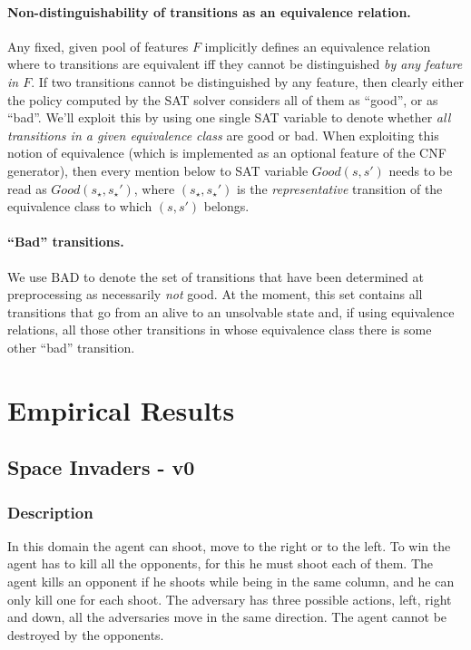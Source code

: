 \documentclass[a4paper]{article}
\newcommand{\badtx}{\ensuremath{\mathrm{BAD}}}
\begin{document}
\paragraph{Non-distinguishability of transitions as an equivalence relation.}
Any fixed, given pool of features $F$ implicitly defines an equivalence relation where to transitions are
equivalent iff they cannot be distinguished \emph{by any feature in $F$}.
If two transitions cannot be distinguished by any feature, then clearly either the policy computed by the SAT solver
considers all of them as ``good'', or as ``bad''.
We'll exploit this by using one single SAT variable to denote whether \emph{all transitions in a given equivalence
class} are good or bad. When exploiting this notion of equivalence (which is implemented as an optional feature of
the CNF generator), then every mention below to SAT variable $Good(s, s')$ needs to be read as $Good(s_{\star}, s_{\star}')$,
where $(s_{\star}, s_{\star}')$ is the \emph{representative} transition of the equivalence class to which $(s, s')$ belongs.

\paragraph{``Bad'' transitions.}
We use \badtx{} to denote the set of transitions that have been determined at preprocessing as necessarily
\emph{not} good.
At the moment, this set contains all transitions that go from an alive to an unsolvable state and, if using
equivalence relations, all those other transitions in whose equivalence class there is some other ``bad'' transition.


\newpage

\section{Empirical Results}


\subsection{Space Invaders - v0}
\subsubsection{Description}
In this domain the agent can shoot, move to the right or to the left. To win the agent has to kill all the opponents, for this he must shoot each of them. The agent kills an opponent if he shoots while being in the same column, and he can only kill one for each shoot. The adversary has three possible actions, left, right and down, all the adversaries move in the same direction. The agent cannot be destroyed by the opponents.
\end{document}
